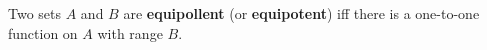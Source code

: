 Two sets $A$ and $B$ are \textbf{equipollent} (or \textbf{equipotent}) iff there is a one-to-one function on $A$ with range $B$.
